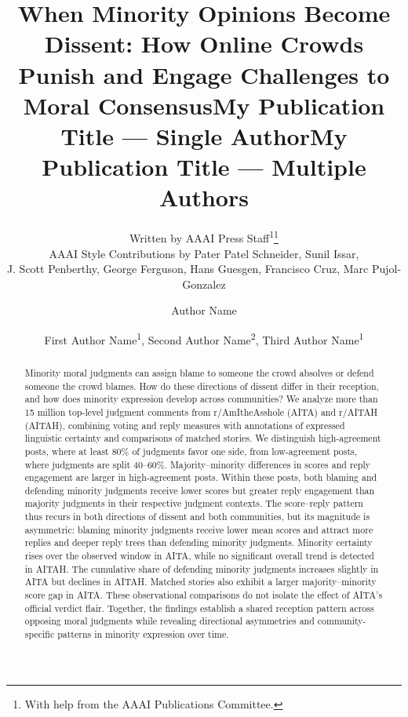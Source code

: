 \documentclass[letterpaper]{article} %
\title{When Minority Opinions Become Dissent: How Online Crowds Punish and Engage Challenges to Moral Consensus}
\author{
    Written by AAAI Press Staff\textsuperscript{\rm 1}\thanks{With help from the AAAI Publications Committee.}\\
    AAAI Style Contributions by Pater Patel Schneider,
    Sunil Issar,\\
    J. Scott Penberthy,
    George Ferguson,
    Hans Guesgen,
    Francisco Cruz\equalcontrib,
    Marc Pujol-Gonzalez\equalcontrib
}
\title{My Publication Title --- Single Author}
\author {
    Author Name
}
\title{My Publication Title --- Multiple Authors}
\author {
    First Author Name\textsuperscript{\rm 1},
    Second Author Name\textsuperscript{\rm 2},
    Third Author Name\textsuperscript{\rm 1}
}
\begin{document}
\maketitle

\begin{abstract}
Minority moral judgments can assign blame to someone the crowd absolves or defend someone the crowd blames. How do these directions of dissent differ in their reception, and how does minority expression develop across communities? We analyze more than 15 million top-level judgment comments from r/AmItheAsshole (AITA) and r/AITAH (AITAH), combining voting and reply measures with annotations of expressed linguistic certainty and comparisons of matched stories. We distinguish high-agreement posts, where at least 80\% of judgments favor one side, from low-agreement posts, where judgments are split 40–60\%. Majority–minority differences in scores and reply engagement are larger in high-agreement posts. Within these posts, both blaming and defending minority judgments receive lower scores but greater reply engagement than majority judgments in their respective judgment contexts. The score–reply pattern thus recurs in both directions of dissent and both communities, but its magnitude is asymmetric: blaming minority judgments receive lower mean scores and attract more replies and deeper reply trees than defending minority judgments. Minority certainty rises over the observed window in AITA, while no significant overall trend is detected in AITAH. The cumulative share of defending minority judgments increases slightly in AITA but declines in AITAH. Matched stories also exhibit a larger majority–minority score gap in AITA. These observational comparisons do not isolate the effect of AITA’s official verdict flair. Together, the findings establish a shared reception pattern across opposing moral judgments while revealing directional asymmetries and community-specific patterns in minority expression over time.
\end{abstract}











\end{document}
